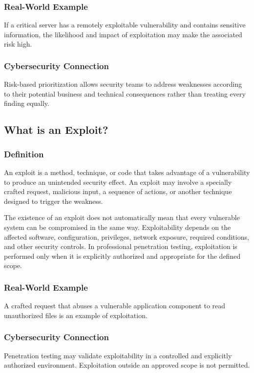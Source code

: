 \documentclass[11pt,a4paper]{article}
\begin{document}
\subsubsection{Real-World Example}
If a critical server has a remotely exploitable vulnerability and contains sensitive information, the likelihood and impact of exploitation may make the associated risk high.

\subsubsection{Cybersecurity Connection}
Risk-based prioritization allows security teams to address weaknesses according to their potential business and technical consequences rather than treating every finding equally.

\subsection{What is an Exploit?}
\subsubsection{Definition}
An exploit is a method, technique, or code that takes advantage of a vulnerability to produce an unintended security effect. An exploit may involve a specially crafted request, malicious input, a sequence of actions, or another technique designed to trigger the weakness.

The existence of an exploit does not automatically mean that every vulnerable system can be compromised in the same way. Exploitability depends on the affected software, configuration, privileges, network exposure, required conditions, and other security controls. In professional penetration testing, exploitation is performed only when it is explicitly authorized and appropriate for the defined scope.

\subsubsection{Real-World Example}
A crafted request that abuses a vulnerable application component to read unauthorized files is an example of exploitation.

\subsubsection{Cybersecurity Connection}
Penetration testing may validate exploitability in a controlled and explicitly authorized environment. Exploitation outside an approved scope is not permitted.
\end{document}
